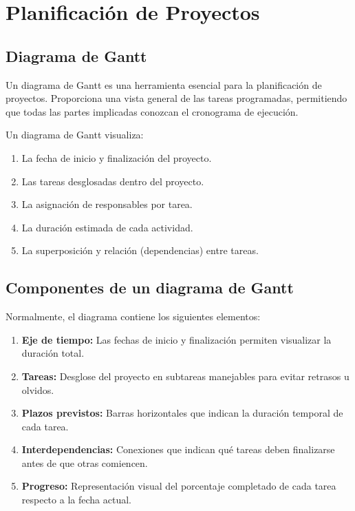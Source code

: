 \documentclass[../main]{subfiles}
\begin{document}
\chapter{Planificación de Proyectos}
\section{Diagrama de Gantt}
Un diagrama de Gantt es una herramienta esencial para la
planificación de proyectos. Proporciona una vista general de las
tareas programadas, permitiendo que todas las partes implicadas
conozcan el cronograma de ejecución.

Un diagrama de Gantt visualiza:
\begin{enumerate}
  \item La fecha de inicio y finalización del proyecto.
  \item Las tareas desglosadas dentro del proyecto.
  \item La asignación de responsables por tarea.
  \item La duración estimada de cada actividad.
  \item La superposición y relación (dependencias) entre tareas.
\end{enumerate}

\section{Componentes de un diagrama de Gantt}
Normalmente, el diagrama contiene los siguientes elementos:
\begin{enumerate}
  \item \textbf{Eje de tiempo:} Las fechas de inicio y finalización
    permiten visualizar la duración total.
  \item \textbf{Tareas:} Desglose del proyecto en subtareas
    manejables para evitar retrasos u olvidos.
  \item \textbf{Plazos previstos:} Barras horizontales que indican la
    duración temporal de cada tarea.
  \item \textbf{Interdependencias:} Conexiones que indican qué tareas
    deben finalizarse antes de que otras comiencen.
  \item \textbf{Progreso:} Representación visual del porcentaje
    completado de cada tarea respecto a la fecha actual.
\end{enumerate}
\end{document}

